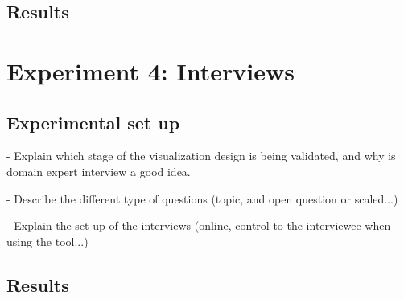 \subsection{Results}

\section{Experiment 4: Interviews}


\subsection{Experimental set up}


- Explain which stage of the visualization design is being validated, and why is domain expert interview a good idea.

- Describe the different type of questions (topic, and open question or scaled...)

- Explain the set up of the interviews (online, control to the interviewee when using the tool...)

\subsection{Results}
